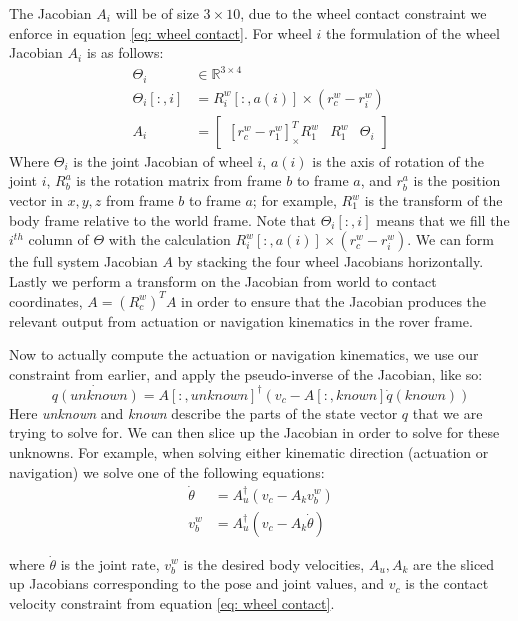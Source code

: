 \documentclass[12pt]{article}
\begin{document}
The Jacobian $A_i$ will be of size $3 \times 10$, due to the wheel contact constraint we enforce in equation \ref{eq: wheel contact}. 
For wheel $i$ the formulation of the wheel Jacobian $A_i$ is as follows:
\begin{align}
    \Theta_i &\in \mathbb{R}^{3 \times 4}\\
    \Theta_i[:, i] &= R^w_i[:, a(i)] \times (r^w_c - r^w_i)\\
    A_i &= \begin{bmatrix}
    [r^w_c - r^w_1]_{\times}^T R^w_1 & R^w_1 & \Theta_i 
    \end{bmatrix}
\end{align}
Where $\Theta_i$ is the joint Jacobian of wheel $i$, $a(i)$ is the axis of rotation of the joint $i$, $R^a_b$ is the rotation matrix from frame $b$ to frame $a$, and $r_b^a$ is the position vector in $x,y,z$ from frame $b$ to frame $a$; for example, $R_1^w$ is the transform of the body frame relative to the world frame. 
Note that $\Theta_i[:, i]$ means that we fill the $i^{th}$ column of $\Theta$ with the calculation $R^w_i[:, a(i)] \times (r^w_c - r^w_i)$.
We can form the full system Jacobian $A$ by stacking the four wheel Jacobians horizontally. 
Lastly we perform a transform on the Jacobian from world to contact coordinates, $A = (R^w_c)^T A $ in order to ensure that the Jacobian produces the relevant output from actuation or navigation kinematics in the rover frame. 

Now to actually compute the actuation or navigation kinematics, we use our constraint from earlier, and apply the pseudo-inverse of the Jacobian, like so: 
\begin{equation}
    \dot{q(unknown)} = A[:, unknown]^{\dagger} (v_c - A[:, known] \dot{q}(known))
\end{equation}
Here {\it unknown} and {\it known} describe the parts of the state vector $q$ that we are trying to solve for. We can then slice up the Jacobian in order to solve for these unknowns. 
For example, when solving either kinematic direction (actuation or navigation) we solve one of the following equations:
\begin{align}
    \dot{\theta} &= A_u^{\dagger} (v_c - A_k v^w_b) \label{eq: actuation}\\
    v^w_b &= A_u^{\dagger} (v_c - A_k \dot{\theta}) \label{eq: navigation}
\end{align}

where $\dot{\theta}$ is the joint rate, $v^w_b$ is the desired body velocities, $A_u, A_k$ are the sliced up Jacobians corresponding to the pose and joint values, and $v_c$ is the contact velocity constraint from equation \ref{eq: wheel contact}. 
\end{document}
